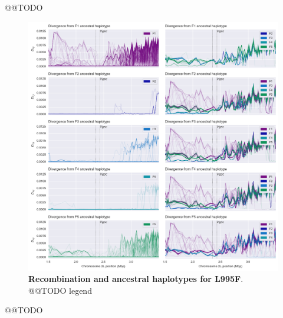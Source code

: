 \documentclass[a4paper,11pt,abstracton]{scrartcl}
\begin{document}
%
@@TODO


%
\begin{figure}[!b]
  \includegraphics[width=1.1\linewidth,center]{artwork/fig_recom.png}
  \caption{\textbf{Recombination and ancestral haplotypes for L995F}. @@TODO legend}
  \label{fig:recom_f}
\end{figure}


%
@@TODO
\end{document}
